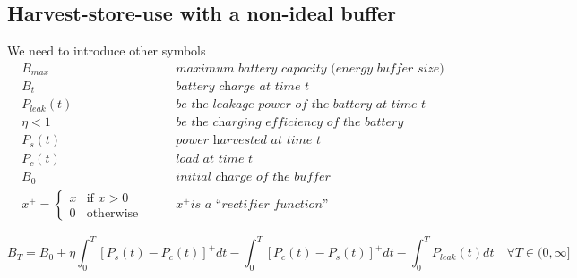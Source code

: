 \subsection{Harvest-store-use with a non-ideal buffer}
We need to introduce other symbols
\begin{align*}
   B_{max} & \quad & \textit{maximum battery capacity (energy buffer size)}\\
   B_{t} & \quad & \textit{battery charge at time t}\\
   P_{leak}(t) & \quad & \textit{be the leakage power of the battery at time t}\\
   \eta < 1 & \quad & \textit{be the charging efficiency of the battery}\\
   P_s(t) & \quad & \textit{power harvested at time t}\\
   P_c(t) & \quad & \textit{load at time t}\\
   B_0 & \quad & \textit{initial charge of the buffer}\\
   x^+ = \begin{cases}
      x & \text{if } x > 0\\
      0 & \text{otherwise}
   \end{cases} 
   & \quad & x^+\textit{is a ``rectifier function''}
\end{align*}

\[
   B_T = B_0 + \eta\int_0^T[P_s(t) - P_c(t)]^+dt - \int_0^T[P_c(t) - P_s(t)]^+dt - \int_0^T P_{leak}(t)dt   \quad \forall T \in (0, \infty]
\]

